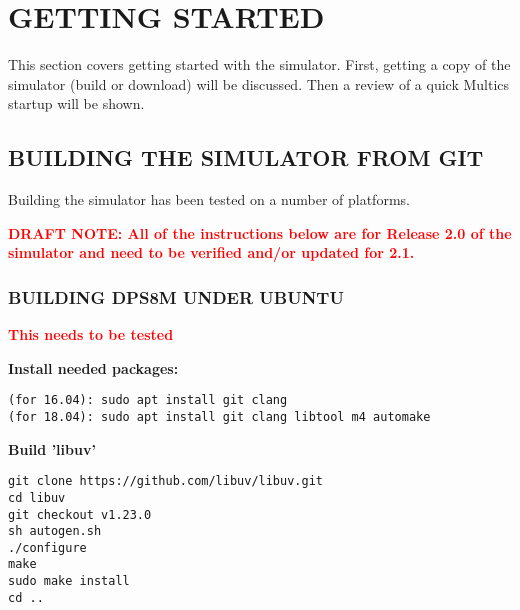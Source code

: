 \section[Getting Started]{GETTING STARTED}

This section covers getting started with the simulator. First, getting a copy of the simulator (build or download) will be discussed.
Then a review of a quick Multics startup will be shown.

\subsection[Building the Simulator from Git]{BUILDING THE SIMULATOR FROM GIT}

Building the simulator has been tested on a number of platforms. 

\textbf{\textcolor{red}{DRAFT NOTE: All of the instructions below are for Release 2.0 of the simulator and need to be verified and/or updated for 2.1.}}

\subsubsection[Building dps8m under Ubuntu]{BUILDING DPS8M UNDER UBUNTU}

\textbf{\textcolor{red}{This needs to be tested}}

\textbf{Install needed packages:}

\begin{adjustwidth}{5ex}{1ex}
	\texttt{(for 16.04):    sudo apt install git clang} \\
    \texttt{(for 18.04):    sudo apt install git clang libtool m4 automake}
\end{adjustwidth}  

\textbf{Build 'libuv'}

\begin{adjustwidth}{5ex}{1ex}
    \texttt{git clone https://github.com/libuv/libuv.git} \\
    \texttt{cd libuv} \\
    \texttt{git checkout v1.23.0} \\
    \texttt{sh autogen.sh} \\
    \texttt{./configure} \\
    \texttt{make} \\
    \texttt{sudo make install} \\
    \texttt{cd ..} \\
\end{adjustwidth}  

